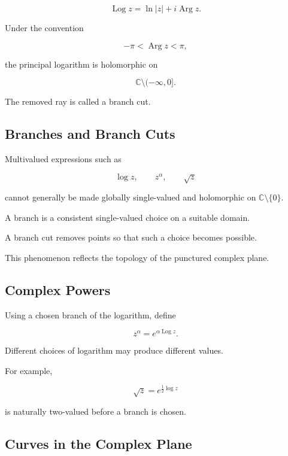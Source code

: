 \[
\boxed{
\operatorname{Log}z
=
\ln|z|
+
i\operatorname{Arg}z.
}
\]

Under the convention

\[
-\pi<\operatorname{Arg}z<\pi,
\]

the principal logarithm is holomorphic on

\[
\boxed{
\mathbb{C}\setminus(-\infty,0].
}
\]

The removed ray is called a branch cut.

\subsection{Branches and Branch Cuts}
\label{subsec:branches-branch-cuts}

Multivalued expressions such as

\[
\log z,
\qquad
z^\alpha,
\qquad
\sqrt{z}
\]

cannot generally be made globally single-valued and holomorphic on
\(\mathbb{C}\setminus\{0\}\).

A branch is a consistent single-valued choice on a suitable domain.

A branch cut removes points so that such a choice becomes possible.

This phenomenon reflects the topology of the punctured complex plane.

\subsection{Complex Powers}
\label{subsec:complex-powers}

Using a chosen branch of the logarithm, define

\[
\boxed{
z^\alpha
=
e^{\alpha\operatorname{Log}z}.
}
\]

Different choices of logarithm may produce different values.

For example,

\[
\sqrt{z}
=
e^{\frac12\log z}
\]

is naturally two-valued before a branch is chosen.

\subsection{Curves in the Complex Plane}
\label{subsec:complex-curves}

